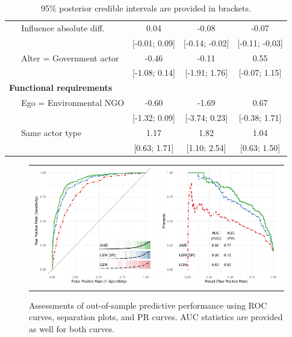 \documentclass[12pt,pdflatex]{elsarticle}
\begin{document}
\begin{table}[ht]
\begin{tabular}{lccc}
  $\;\;\;\;$ Influence absolute diff. & 0.04 & -0.08 & -0.07 \\ 
   & [-0.01; 0.09] & [-0.14; -0.02] & [-0.11; -0.03] \\ 
  $\;\;\;\;$ Alter = Government actor & -0.46 & -0.11 & 0.55 \\ 
   & [-1.08; 0.14] & [-1.91; 1.76] & [-0.07; 1.15] \\ 
  \textbf{Functional requirements} &  &  &  \\ 
  $\;\;\;\;$ Ego = Environmental NGO & -0.60 & -1.69 & 0.67 \\ 
   & [-1.32; 0.09] & [-3.74; 0.23] & [-0.38; 1.71] \\ 
  $\;\;\;\;$ Same actor type & 1.17 & 1.82 & 1.04 \\ 
   & [0.63; 1.71] & [1.10; 2.54] & [0.63; 1.50] \\ 
   \hline
\hline
\end{tabular}
\endgroup
\caption{95\% posterior credible intervals are provided in brackets.}
\label{tab:regTable_latSpace}
\end{table}

\begin{figure}[ht]
	\centering
	\begin{tabular}{cc}
	\includegraphics[width=.5\textwidth]{roc_latSpace_outSampleSmall} &
	\includegraphics[width=.5\textwidth]{rocPr_latSpace_outSampleSmall}
	\end{tabular}
	\caption{Assessments of out-of-sample predictive performance using ROC curves, separation plots, and PR curves. AUC statistics are provided as well for both curves.}
	\label{fig:roc_latentSpace}
\end{figure}
\end{document}
